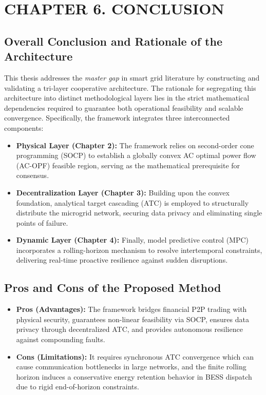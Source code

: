 \documentclass{thesis_1side}
\begin{document}
\section*{CHAPTER 6. CONCLUSION}

\setcounter{section}{6}
    \setcounter{subsection}{0}

\subsection{Overall Conclusion and Rationale of the Architecture}

This thesis addresses the \textit{master gap} in smart grid literature by constructing and validating a tri-layer cooperative architecture. The rationale for segregating this architecture into distinct methodological layers lies in the strict mathematical dependencies required to guarantee both operational feasibility and scalable convergence. Specifically, the framework integrates three interconnected components:

\begin{itemize}
    \item \textbf{Physical Layer (Chapter 2):} The framework relies on second-order cone programming (SOCP) to establish a globally convex AC optimal power flow (AC-OPF) feasible region, serving as the mathematical prerequisite for consensus.
    \item \textbf{Decentralization Layer (Chapter 3):} Building upon the convex foundation, analytical target cascading (ATC) is employed to structurally distribute the microgrid network, securing data privacy and eliminating single points of failure.
    \item \textbf{Dynamic Layer (Chapter 4):} Finally, model predictive control (MPC) incorporates a rolling-horizon mechanism to resolve intertemporal constraints, delivering real-time proactive resilience against sudden disruptions.
\end{itemize}

\subsection{Pros and Cons of the Proposed Method}

\begin{itemize}
    \item \textbf{Pros (Advantages):} The framework bridges financial P2P trading with physical security, guarantees non-linear feasibility via SOCP, ensures data privacy through decentralized ATC, and provides autonomous resilience against compounding faults.
    \item \textbf{Cons (Limitations):} It requires synchronous ATC convergence which can cause communication bottlenecks in large networks, and the finite rolling horizon induces a conservative energy retention behavior in BESS dispatch due to rigid end-of-horizon constraints.
\end{itemize}
\end{document}
